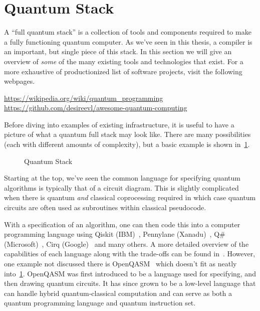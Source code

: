 \section{Quantum Stack}

A ``full quantum stack'' is a collection of tools and components required to make a fully functioning quantum computer.
As we've seen in this thesis, a compiler is an important, but single piece of this stack.
In this section we will give an overview of \emph{some} of the many existing tools and technologies that exist.
For a more exhaustive of productionized list of software projects, visit the following webpages.
\begin{center}
    \url{https://wikipedia.org/wiki/quantum_programming}
    \url{https://github.com/desireevl/awesome-quantum-computing}
\end{center}

Before diving into examples of existing infrastructure, it is useful to have a picture of what a quantum full stack may look like.
There are many possibilities (each with different amounts of complexity), but a basic example is shown in~\cref{fig:quantumstack}.

\begin{figure}[h]
    \centering
    
    \caption{Quantum Stack}\label{fig:quantumstack}
\end{figure}

Starting at the top, we've seen the common language for specifying quantum algorithms is typically that of a circuit diagram.
This is slightly complicated when there is quantum \emph{and} classical coprocessing required in which case quantum circuits are often used as subroutines within classical pseudocode.

With a specification of an algorithm, one can then code this into a computer programming language using Qiskit (IBM)~\cite{qiskit}, Pennylane (Xanadu)~\cite{pennylane}, Q\# (Microsoft)~\cite{qsharp}, Cirq (Google)~\cite{cirq} and many others.
A more detailed overview of the capabilities of each language along with the trade-offs can be found in~\cite{qlangcomparision}.
However, one example not discussed there is OpenQASM~\cite{openqasm2,openqasm3} which doesn't fit as neatly into~\cref{fig:quantumstack}.
OpenQASM was first introduced to be a language used for specifying, and then drawing quantum circuits.
It has since grown to be a low-level language that can handle hybrid quantum-classical computation and can serve as both a quantum programming language and quantum instruction set.

